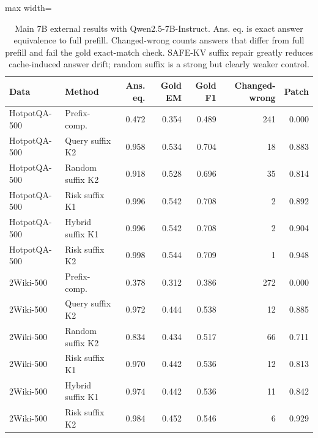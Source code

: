 \begin{table}[t]
\centering
\footnotesize
\begin{adjustbox}{max width=\textwidth}
\begin{tabular}{llrrrrr}
\toprule
Data & Method & Ans. eq. & Gold EM & Gold F1 & Changed-wrong & Patch \\
\midrule
HotpotQA-500 & Prefix-comp. & 0.472 & 0.354 & 0.489 & 241 & 0.000 \\
HotpotQA-500 & Query suffix K2 & 0.958 & 0.534 & 0.704 & 18 & 0.883 \\
HotpotQA-500 & Random suffix K2 & 0.918 & 0.528 & 0.696 & 35 & 0.814 \\
HotpotQA-500 & Risk suffix K1 & 0.996 & 0.542 & 0.708 & 2 & 0.892 \\
HotpotQA-500 & Hybrid suffix K1 & 0.996 & 0.542 & 0.708 & 2 & 0.904 \\
HotpotQA-500 & Risk suffix K2 & 0.998 & 0.544 & 0.709 & 1 & 0.948 \\
\midrule
2Wiki-500 & Prefix-comp. & 0.378 & 0.312 & 0.386 & 272 & 0.000 \\
2Wiki-500 & Query suffix K2 & 0.972 & 0.444 & 0.538 & 12 & 0.885 \\
2Wiki-500 & Random suffix K2 & 0.834 & 0.434 & 0.517 & 66 & 0.711 \\
2Wiki-500 & Risk suffix K1 & 0.970 & 0.442 & 0.536 & 12 & 0.813 \\
2Wiki-500 & Hybrid suffix K1 & 0.974 & 0.442 & 0.536 & 11 & 0.842 \\
2Wiki-500 & Risk suffix K2 & 0.984 & 0.452 & 0.546 & 6 & 0.929 \\
\bottomrule
\end{tabular}
\end{adjustbox}
\caption{Main 7B external results with Qwen2.5-7B-Instruct. Ans. eq. is exact answer equivalence to full prefill. Changed-wrong counts answers that differ from full prefill and fail the gold exact-match check. SAFE-KV suffix repair greatly reduces cache-induced answer drift; random suffix is a strong but clearly weaker control.}
\label{tab:external-main}
\end{table}
